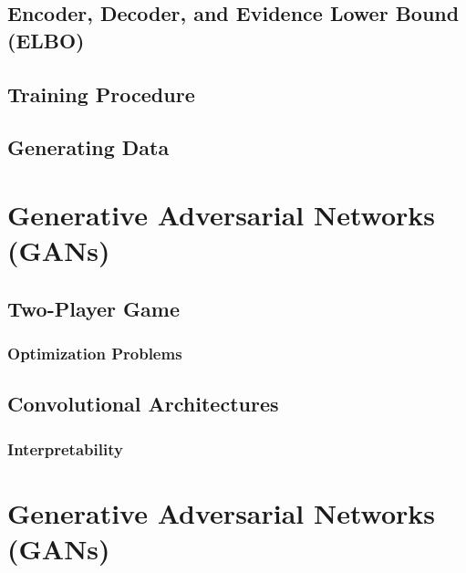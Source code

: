 		\subsection{Encoder, Decoder, and Evidence Lower Bound (ELBO)} %

		\subsection{Training Procedure} %

		\subsection{Generating Data} %

	\section{Generative Adversarial Networks (GANs)} %

		\subsection{Two-Player Game} %

			\subsubsection{Optimization Problems} %

		\subsection{Convolutional Architectures} %

			\subsubsection{Interpretability} %

	\section{Generative Adversarial Networks (GANs)} %

